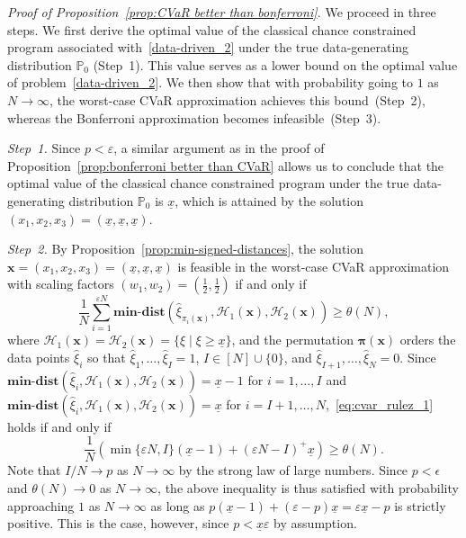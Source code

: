 \documentclass[nonblindrev]{informs2017}
\newcommand{\1}[1]{\mathds{1}{\left(#1\right)}}
\begin{document}
\noindent \emph{Proof of Proposition~\ref{prop:CVaR better than bonferroni}.}
We proceed in three steps. We first derive the optimal value of the classical chance constrained program associated with~\eqref{data-driven_2} under the true data-generating distribution $\mathbb{P}_0$ (Step~1). This value serves as a lower bound on the optimal value of problem~\eqref{data-driven_2}. We then show that with probability going to $1$ as $N \to \infty$, the worst-case CVaR approximation achieves this bound~(Step~2), whereas the Bonferroni approximation becomes infeasible~(Step~3).

{\em Step~1.} Since $p < \varepsilon$, a similar argument as in the proof of Proposition~\ref{prop:bonferroni better than CVaR} allows us to conclude that the optimal value of the classical chance constrained program under the true data-generating distribution $\mathbb{P}_0$ is $\underline{x}$, which is attained by the solution $(x_1, x_2, x_3) = (\underline{x}, \underline{x}, \underline{x})$.

{\em Step~2.} By Proposition~\ref{prop:min-signed-distances}, the solution $\bm{x} = (x_1, x_2, x_3) = (\underline{x}, \underline{x}, \underline{x})$ is feasible in the worst-case CVaR approximation with scaling factors $(w_1, w_2) = (\frac{1}{2}, \frac{1}{2})$ if and only if
\begin{equation}\label{eq:cvar_rulez_1}
	\dfrac{1}{N} \sum_{i = 1}^{\varepsilon N} \mathbf{min\textbf{-}dist} (\hat{\xi}_{\pi_i (\bm{x})}, \mathcal{H}_1(\bm{x}), \mathcal{H}_2(\bm{x})) \geq \theta(N),
\end{equation}
where $\mathcal{H}_1 (\bm{x}) = \mathcal{H}_2(\bm{x}) = \{\xi \mid \xi \geq \underline{x}\}$, and the permutation $\bm{\pi} (\bm{x})$ orders the data points $\hat{\xi}_i$ so that $\hat{\xi}_1, \ldots, \hat{\xi}_I = 1$, $I \in [N] \cup \{ 0 \}$, and $\hat{\xi}_{I+1}, \ldots, \hat{\xi}_N = 0$. Since $\mathbf{min\textbf{-}dist} (\hat{\xi}_i, \mathcal{H}_1 (\bm{x}), \mathcal{H}_2 (\bm{x})) = \underline{x} - 1$ for $i = 1, \ldots, I$ and $\mathbf{min\textbf{-}dist} (\hat{\xi}_i, \mathcal{H}_1 (\bm{x}), \mathcal{H}_2 (\bm{x})) = \underline{x}$ for $i = I + 1, \ldots, N$,~\eqref{eq:cvar_rulez_1} holds if and only if
\begin{equation*}
	\dfrac{1}{N}\left(\min\{\varepsilon N, I\} (\underline{x} - 1) + (\varepsilon N - I)^+ \underline{x} \right) \geq \theta(N).
\end{equation*}
Note that $I / N \to p$ as $N \to \infty$ by the strong law of large numbers. Since $p < \epsilon$ and $\theta(N) \to 0$ as $N \to \infty$, the above inequality is thus satisfied with probability approaching $1$ as $N \to \infty$ as long as $p (\underline{x} - 1) + (\varepsilon - p) \underline{x} = \varepsilon \underline{x} - p$ is strictly positive. This is the case, however, since $p < \underline{x} \varepsilon$ by assumption.
\end{document}

